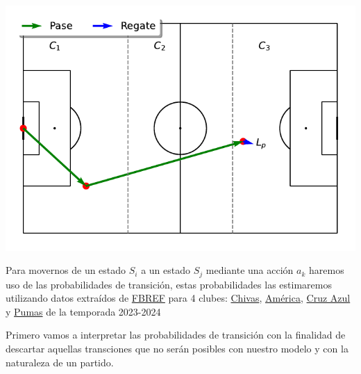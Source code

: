 \documentclass[
  us-letterpaper,
  DIV=11,
  numbers=noendperiod]{scrreprt}
\begin{document}
\includegraphics{modelo_files/figure-pdf/cell-2-output-1.pdf}

Para movernos de un estado \(S_i\) a un estado \(S_j\) mediante una
acción \(a_k\) haremos uso de las probabilidades de transición, estas
probabilidades las estimaremos utilizando datos extraídos de
\href{https://fbref.com/es/}{FBREF} para 4 clubes:
\href{https://fbref.com/es/equipos/c02b0f7a/2023-2024/Estadisticas-de-Guadalajara}{Chivas},
\href{https://fbref.com/es/equipos/18d3c3a3/2023-2024/Estadisticas-de-America}{América},
\href{https://fbref.com/es/equipos/632f1838/2023-2024/Estadisticas-de-Cruz-Azul}{Cruz
Azul} y
\href{https://fbref.com/es/equipos/c9d59c6c/2023-2024/Estadisticas-de-Pumas-UNAM}{Pumas}
de la temporada 2023-2024

Primero vamos a interpretar las probabilidades de transición con la
finalidad de descartar aquellas transciones que no serán posibles con
nuestro modelo y con la naturaleza de un partido.
\end{document}

